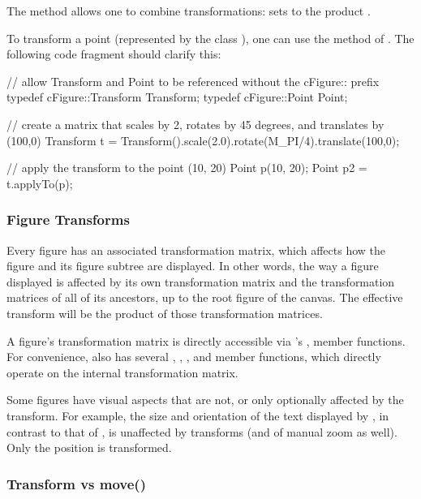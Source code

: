 The  method allows one to combine transformations:
 sets  to the product .

To transform a point (represented by the class ),
one can use the  method of . The
following code fragment should clarify this:

\begin{cpp}
// allow Transform and Point to be referenced without the cFigure:: prefix
typedef cFigure::Transform Transform;
typedef cFigure::Point Point;

// create a matrix that scales by 2, rotates by 45 degrees, and translates by (100,0)
Transform t = Transform().scale(2.0).rotate(M_PI/4).translate(100,0);

// apply the transform to the point (10, 20)
Point p(10, 20);
Point p2 = t.applyTo(p);
\end{cpp}


\subsubsection{Figure Transforms}
\label{sec:graphics:figure-transforms}

Every figure has an associated transformation matrix, which
affects how the figure and its figure subtree are displayed.
In other words, the way a figure displayed is affected by its own
transformation matrix and the transformation matrices of all of its
ancestors, up to the root figure of the canvas. The effective transform
will be the product of those transformation matrices.

A figure's transformation matrix is directly accessible via 's
,  member functions.
For convenience,  also has several , ,
,  and  member functions,
which directly operate on the internal transformation matrix.

Some figures have visual aspects that are not, or only optionally affected
by the transform. For example, the size and orientation of the text
displayed by , in contrast to that of
, is unaffected by transforms (and of manual zoom as
well). Only the position is transformed.

\subsubsection{Transform vs move()}
\label{sec:graphics:figure-transform-vs-move}

